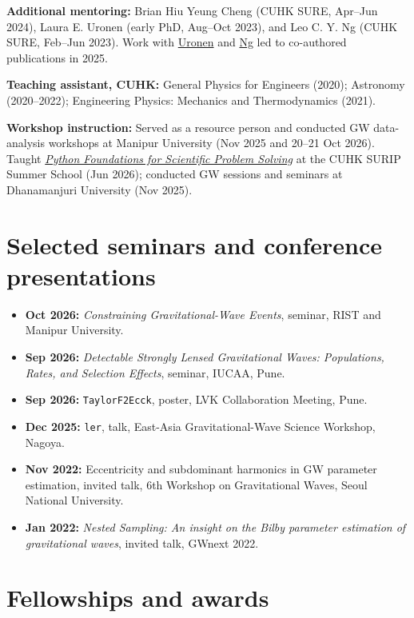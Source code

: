 \documentclass[11pt]{article}
\begin{document}
\textbf{Additional mentoring:} Brian Hiu Yeung Cheng (CUHK SURE, Apr--Jun 2024), Laura E. Uronen (early PhD, Aug--Oct 2023), and Leo C. Y. Ng (CUHK SURE, Feb--Jun 2023). Work with \href{https://arxiv.org/abs/2406.14257}{Uronen} and \href{https://arxiv.org/abs/2403.16532}{Ng} led to co-authored publications in 2025.

\textbf{Teaching assistant, CUHK:} General Physics for Engineers (2020); Astronomy (2020--2022); Engineering Physics: Mechanics and Thermodynamics (2021).

\textbf{Workshop instruction:} Served as a resource person and conducted GW data-analysis workshops at Manipur University (Nov 2025 and 20--21 Oct 2026). Taught \href{https://gw.phy.cuhk.edu.hk/activities/surip-summer-school-2026/}{\textit{Python Foundations for Scientific Problem Solving}} at the CUHK SURIP Summer School (Jun 2026); conducted GW sessions and seminars at Dhanamanjuri University (Nov 2025).
\section*{Selected seminars and conference presentations}
\begin{itemize}
\item \textbf{Oct 2026:} \textit{Constraining Gravitational-Wave Events}, seminar, RIST and Manipur University.
\item \textbf{Sep 2026:} \textit{Detectable Strongly Lensed Gravitational Waves: Populations, Rates, and Selection Effects}, seminar, IUCAA, Pune.
\item \textbf{Sep 2026:} \texttt{TaylorF2Ecck}, poster, LVK Collaboration Meeting, Pune.
\item \textbf{Dec 2025:} \texttt{ler}, talk, East-Asia Gravitational-Wave Science Workshop, Nagoya.
\item \textbf{Nov 2022:} Eccentricity and subdominant harmonics in GW parameter estimation, invited talk, 6th Workshop on Gravitational Waves, Seoul National University.
\item \textbf{Jan 2022:} \textit{Nested Sampling: An insight on the Bilby parameter estimation of gravitational waves}, invited talk, GWnext 2022.
\end{itemize}
\section*{Fellowships and awards}
\end{document}
